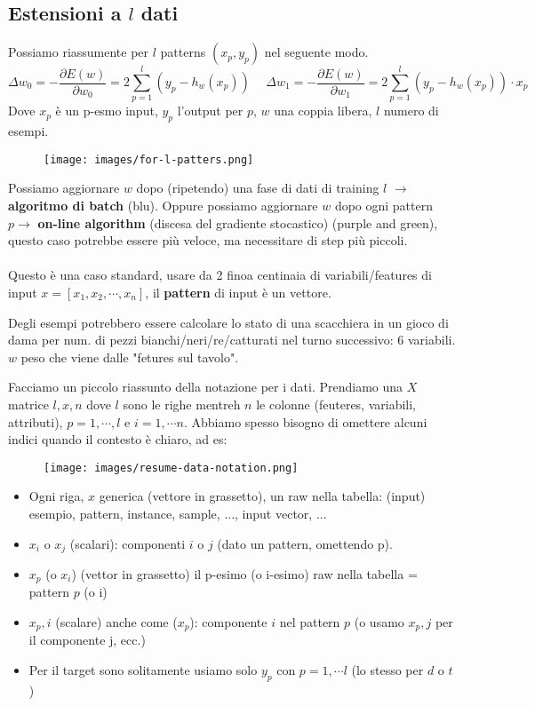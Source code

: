 \subsection{Estensioni a $l$ dati}
\begin{definition}
    Possiamo riassumente per $l$ patterns $(x_p, y_p)$ nel seguente modo.
    $$\Delta w_0 = - \frac{\partial E(w)}{\partial w_0} = 2 \sum_{p=1}^{l}(y_p - h_w(x_p)) \hspace{15pt} \Delta w_1 = -\frac{\partial E(w)}{\partial w_1} = 2 \sum_{p=1}^{l}(y_p - h_w(x_p)) \cdot x_p$$
    Dove $x_p$ è un p-esmo input, $y_p$ l'output per $p$, $w$ una coppia libera, $l$ numero di esempi.
\end{definition}
\begin{figure}[h!]
    \centering
    \texttt{[image: images/for-l-patters.png]}
\end{figure}
\hspace{-15pt}Possiamo aggiornare $w$ dopo (ripetendo) una fase di dati di training $l$ $\to$ \textbf{algoritmo di batch} (blu). Oppure
possiamo aggiornare $w$ dopo ogni pattern $p \to$ \textbf{on-line algorithm} (discesa del gradiente stocastico) (purple and green), questo caso 
potrebbe essere più veloce, ma necessitare di step più piccoli.\\\\
Questo è una caso standard, usare da 2 finoa centinaia di variabili/features di input  $x = [x_1, x_2, \cdots, x_n]$, il \textbf{pattern} di input
è un vettore.
\begin{example}
    Degli esempi potrebbero essere calcolare lo stato di una scacchiera in un gioco di dama per num. di pezzi bianchi/neri/re/catturati
    nel turno successivo: 6 variabili. $w$ peso che viene dalle "fetures sul tavolo".
\end{example}
\hspace{-15pt}Facciamo un piccolo riassunto della notazione per i dati. Prendiamo una $X$ matrice $l, x, n$ dove $l$ sono le righe
mentreh $n$ le colonne (feuteres, variabili, attributi), $p = 1, \cdots, l$ e $i = 1, \cdots n$. Abbiamo spesso bisogno di omettere alcuni
indici quando il contesto è chiaro, ad es:
\begin{figure}[h!]
    \centering
    \texttt{[image: images/resume-data-notation.png]}
\end{figure}
\begin{itemize}
    \item Ogni riga, $x$ generica (vettore in grassetto), un raw nella tabella: (input) esempio, pattern, instance, sample, ..., input vector, ...
    \item $x_i$ o $x_j$ (scalari): componenti $i$ o $j$ (dato un pattern, omettendo p).
    \item $x_p$ (o $x_i$) (vettor in grassetto) il p-esimo (o i-esimo) raw nella tabella = pattern $p$ (o i)
    \item $x_p,i$ (scalare) anche come ($x_p$): componente $i$ nel pattern $p$ (o usamo $x_p,j$ per il componente j, ecc.)
    \item Per il target sono solitamente usiamo solo $y_p$ con $p=1, \cdots l$ (lo stesso per $d$ o $t$)
\end{itemize}
